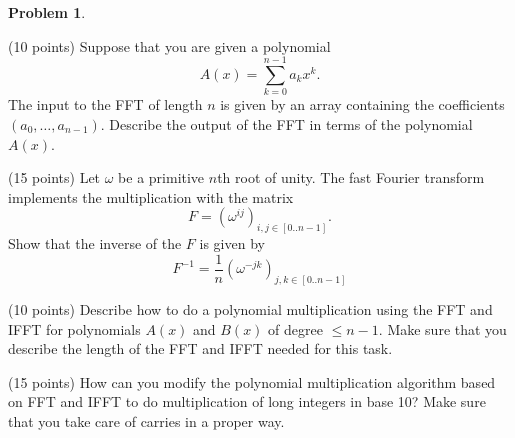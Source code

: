 \documentclass{article}
\theoremstyle{definition}
\newtheorem{problem}{Problem}
\begin{document}
\begin{problem} 
\begin{compactenum}[(a)]
\item (10 points) Suppose that you are given a polynomial 
$$ A(x) = \sum_{k=0}^{n-1} a_k x^k.$$ 
The input to the FFT of length $n$ is given by an array containing the coefficients
$(a_0,\ldots, a_{n-1})$. Describe the output of the FFT in terms of
the polynomial $A(x)$. 
\\
\item (15 points) Let $\omega$ be a primitive $n$th root of unity. 
The fast Fourier transform implements the multiplication with
  the matrix 
$$ F = (\omega^{ij})_{i,j\in [0..n-1]}.$$
Show that the inverse of the $F$ is given by 
$$ F^{-1} = \frac{1}{n}  (\omega^{-jk})_{j,k\in [0..n-1]}$$
\item (10 points) Describe how to do a polynomial multiplication using the FFT and
  IFFT for polynomials $A(x)$ and $B(x)$ of degree $\le n-1$. Make
  sure that you describe the length of the FFT and IFFT needed for
  this task.  \\
\item (15 points) How can you modify the polynomial multiplication algorithm based
  on FFT and IFFT to do multiplication of long integers in base 10?
  Make sure that you take care of carries in a proper way. \\
\end{compactenum}
\end{problem}
\end{document}
